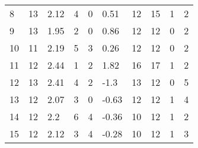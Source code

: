 \documentclass{article}
\begin{document}
\begin{table}[h!]
\begin{tabular}{|l|lllllllll|}
8        & 13                        & 2.12                         & 4                             & 0                             & 0.51                         & 12                            & 15                            & 1                             & 2        \\ \cline{1-1}
9        & 13                        & 1.95                         & 2                             & 0                             & 0.86                         & 12                            & 12                            & 0                             & 2        \\ \cline{1-1}
10       & 11                        & 2.19                         & 5                             & 3                             & 0.26                         & 12                            & 12                            & 0                             & 2        \\ \cline{1-1}
11       & 12                        & 2.44                         & 1                             & 2                             & 1.82                         & 16                            & 17                            & 1                             & 2        \\ \cline{1-1}
12       & 13                        & 2.41                         & 4                             & 2                             & -1.3                         & 13                            & 12                            & 0                             & 5        \\ \cline{1-1}
13       & 12                        & 2.07                         & 3                             & 0                             & -0.63                        & 12                            & 12                            & 1                             & 4        \\ \cline{1-1}
14       & 12                        & 2.2                          & 6                             & 4                             & -0.36                        & 10                            & 12                            & 1                             & 2        \\ \cline{1-1}
15       & 12                        & 2.12                         & 3                             & 4                             & -0.28                        & 10                            & 12                            & 1                             & 3        \\ \hline
\end{tabular}
\end{table}
\end{document}
